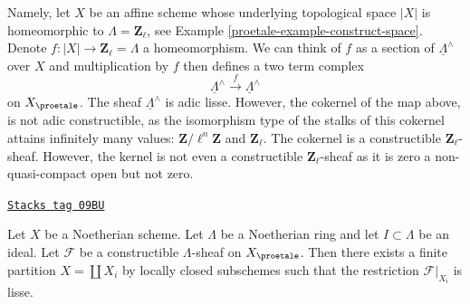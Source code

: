 \medskip\noindent
Namely, let $X$ be an affine scheme whose underlying topological space $|X|$
is homeomorphic to $\Lambda = \mathbf{Z}_\ell$, see
Example \ref{proetale-example-construct-space}. Denote
$f : |X| \to \mathbf{Z}_\ell = \Lambda$
a homeomorphism. We can think of $f$ as a section of
$\underline{\Lambda}^\wedge$ over $X$ and multiplication by $f$
then defines a two term complex
$$
\underline{\Lambda}^\wedge \xrightarrow{f} \underline{\Lambda}^\wedge
$$
on $X_\proetale$. The sheaf $\underline{\Lambda}^\wedge$ is adic lisse.
However, the cokernel of the map above, is not adic constructible, as
the isomorphism type of the stalks of this cokernel attains infinitely
many values: $\mathbf{Z}/\ell^n\mathbf{Z}$ and $\mathbf{Z}_\ell$.
The cokernel is a constructible $\mathbf{Z}_\ell$-sheaf.
However, the kernel is not even a constructible $\mathbf{Z}_\ell$-sheaf
as it is zero a non-quasi-compact open but not zero.

\begin{lemma}
\label{proetale-lemma-Noetherian-constructible}
\href{https://stacks.math.columbia.edu/tag/09BU}{\texttt{Stacks tag 09BU}}

Let $X$ be a Noetherian scheme. Let $\Lambda$ be a Noetherian ring and
let $I \subset \Lambda$ be an ideal. Let $\mathcal{F}$ be a
constructible $\Lambda$-sheaf on $X_\proetale$.
Then there exists a finite partition $X = \coprod X_i$ by
locally closed subschemes such that the restriction $\mathcal{F}|_{X_i}$
is lisse.
\end{lemma}

